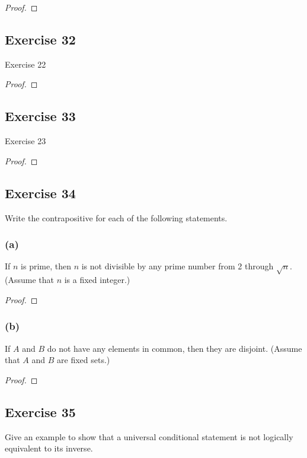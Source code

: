 \documentclass[14pt]{extarticle}
\begin{document}
\begin{proof}

\end{proof}

\subsection{Exercise 32}
Exercise 22

\begin{proof}

\end{proof}

\subsection{Exercise 33}
Exercise 23

\begin{proof}

\end{proof}

\subsection{Exercise 34}
Write the contrapositive for each of the following statements.

\subsubsection{(a)}
If $n$ is prime, then $n$ is not divisible by any prime number from 2 through $\sqrt{n}$. (Assume that $n$ is a fixed integer.)

\begin{proof}

\end{proof}

\subsubsection{(b)}
If $A$ and $B$ do not have any elements in common, then they are disjoint. (Assume that $A$ and $B$ are fixed sets.)

\begin{proof}

\end{proof}

\subsection{Exercise 35}
Give an example to show that a universal conditional statement is not logically equivalent to its inverse.
\end{document}
